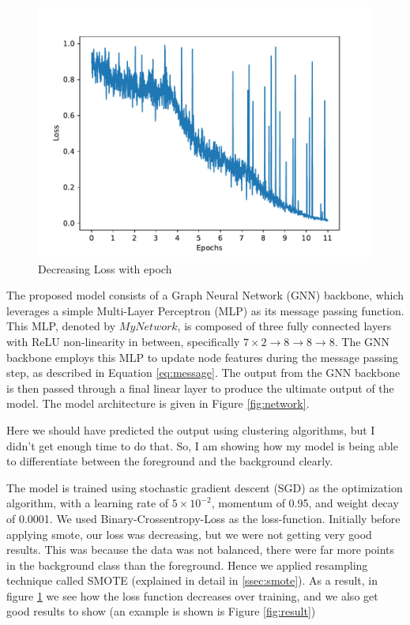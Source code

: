     \begin{figure}
        \centering
        \includegraphics[width=0.9\linewidth]{images/loss.pdf}
        \caption{Decreasing Loss with epoch}
        \label{fig:loss}
    \end{figure}

    The proposed model consists of a Graph Neural Network (GNN) backbone, which leverages a simple Multi-Layer Perceptron (MLP) as its message passing function. This MLP, denoted by $\mathit{MyNetwork}$, is composed of three fully connected layers with ReLU non-linearity in between, specifically $7\times2\rightarrow8\rightarrow8\rightarrow8$. The GNN backbone employs this MLP to update node features during the message passing step, as described in Equation \ref{eq:message}. The output from the GNN backbone is then passed through a final linear layer to produce the ultimate output of the model. The model architecture is given in Figure \ref{fig:network}.
    

    Here we should have predicted the output using clustering algorithms, but I didn't get enough time to do that. So, I am showing how my model is being able to differentiate between the foreground and the background clearly. 

    The model is trained using stochastic gradient descent (SGD) as the optimization algorithm, with a learning rate of $5 \times 10^{-2}$, momentum of 0.95, and weight decay of 0.0001. We used Binary-Crossentropy-Loss as the loss-function. Initially before applying smote, our loss was decreasing, but we were not getting very good results. This was because the data was not balanced, there were far more points in the background class than the foreground. Hence we applied resampling technique called SMOTE (explained in detail in \ref{ssec:smote}). As a result, in figure \ref{fig:loss} we see how the loss function decreases over training, and we also get good results to show (an example is shown is Figure \ref{fig:result})

